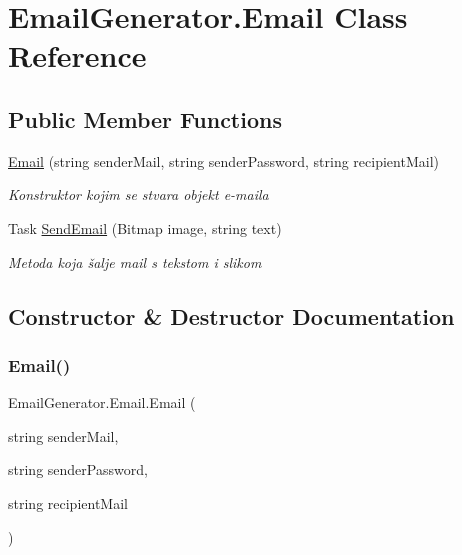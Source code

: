 \hypertarget{class_email_generator_1_1_email}{}\section{Email\+Generator.\+Email Class Reference}
\label{class_email_generator_1_1_email}
\subsection*{Public Member Functions}
\begin{DoxyCompactItemize}
\item 
\mbox{\hyperlink{class_email_generator_1_1_email_a8bdb91b81876d524492382702a5b12b8}{Email}} (string sender\+Mail, string sender\+Password, string recipient\+Mail)
\begin{DoxyCompactList}\small\item\em Konstruktor kojim se stvara objekt e-\/maila \end{DoxyCompactList}\item 
Task \mbox{\hyperlink{class_email_generator_1_1_email_a14690b1a17e4bf926cd840c06da283d9}{Send\+Email}} (Bitmap image, string text)
\begin{DoxyCompactList}\small\item\em Metoda koja šalje mail s tekstom i slikom \end{DoxyCompactList}\end{DoxyCompactItemize}


\subsection{Constructor \& Destructor Documentation}
\mbox{\label{class_email_generator_1_1_email_a8bdb91b81876d524492382702a5b12b8}} 
\subsubsection{\texorpdfstring{Email()}{Email()}}
{\footnotesize\ttfamily Email\+Generator.\+Email.\+Email (\begin{DoxyParamCaption}\item[{string}]{sender\+Mail,  }\item[{string}]{sender\+Password,  }\item[{string}]{recipient\+Mail }\end{DoxyParamCaption})}




